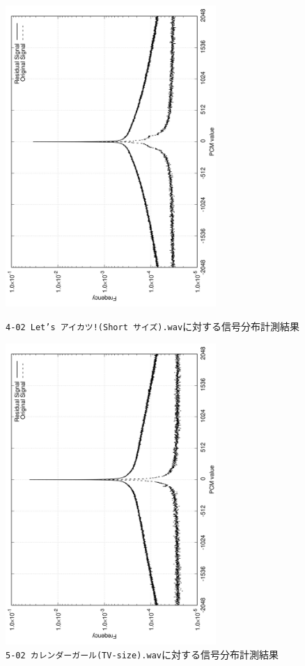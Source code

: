 \documentclass[uplatex,dvipdfmx,b5j,10pt]{jsbook}
\theoremstyle{definition}
\begin{document}
\begin{figure}[htbp]
  \begin{center}
    \includegraphics[width=80mm,angle=-90]{./figs/letsaikatsu_dist.png}
    \caption{\texttt{4-02 Let’s アイカツ!(Short サイズ).wav}に対する信号分布計測結果} \label{letsaikatsu_dist}
  \end{center}
  \begin{center}
    \includegraphics[width=80mm,angle=-90]{./figs/calendergirl_dist.png}
    \caption{\texttt{5-02 カレンダーガール(TV-size).wav}に対する信号分布計測結果} \label{calendergirl_dist}
  \end{center}
\end{figure}
\end{document}
